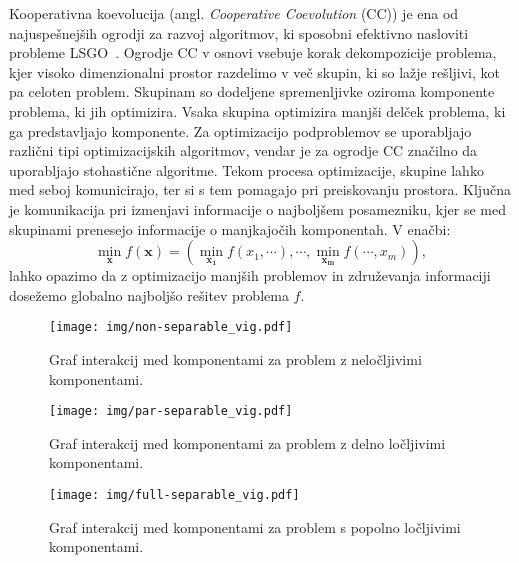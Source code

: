 Kooperativna koevolucija (angl. \textit{Cooperative Coevolution} (CC)) je ena od najuspešnejših ogrodji za razvoj algoritmov, ki sposobni efektivno nasloviti probleme LSGO~\cite{bib:metaheuristic_lsgo}.
Ogrodje CC v osnovi vsebuje korak dekompozicije problema, kjer visoko dimenzionalni prostor razdelimo v več skupin, ki so lažje rešljivi, kot pa celoten problem.
Skupinam so dodeljene spremenljivke oziroma komponente problema, ki jih optimizira.
Vsaka skupina optimizira manjši delček problema, ki ga predstavljajo komponente.
Za optimizacijo podproblemov se uporabljajo različni tipi optimizacijskih algoritmov, vendar je za ogrodje CC značilno da uporabljajo stohastične algoritme.
Tekom procesa optimizacije, skupine lahko med seboj komunicirajo, ter si s tem pomagajo pri preiskovanju prostora.
Ključna je komunikacija pri izmenjavi informacije o najboljšem posamezniku, kjer se med skupinami prenesejo informacije o manjkajočih komponentah.
V enačbi:
\begin{equation}
    \min_{\mathbf{x}}{f(\mathbf{x})} = \left( \min_{\mathbf{x_1}}{f(x_1,\cdots)}, \cdots , \min_{\mathbf{x_m}}{f(\cdots, x_m)} \right), \label{eq:devide_opt_func}
\end{equation}
lahko opazimo da z optimizacijo manjših problemov in združevanja informaciji dosežemo globalno najboljšo rešitev problema $f$.

\begin{figure}[ht]
    \centering
    \texttt{[image: img/non-separable\_vig.pdf]}
    \caption{Graf interakcij med komponentami za problem z neločljivimi komponentami.}\label{fig:non_separable}
\end{figure}

\begin{figure}[ht]
    \centering
    \texttt{[image: img/par-separable\_vig.pdf]}
    \caption{Graf interakcij med komponentami za problem z delno ločljivimi komponentami.}\label{fig:par_separable}
\end{figure}

\begin{figure}[ht]
    \centering
    \texttt{[image: img/full-separable\_vig.pdf]}
    \caption{Graf interakcij med komponentami za problem s popolno ločljivimi komponentami.}\label{fig:full_separable}
\end{figure}

